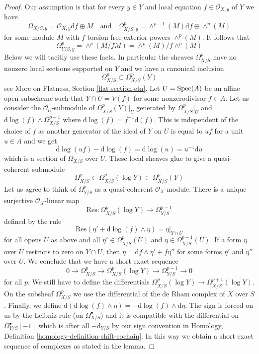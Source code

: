 \begin{proof}
Our assumption is that for every $y \in Y$ and local equation
$f \in \mathcal{O}_{X, y}$ of $Y$ we have
$$
\Omega_{X/S, y} = \mathcal{O}_{X, y}\text{d}f \oplus M
\quad\text{and}\quad
\Omega^p_{X/S, y} = \wedge^{p - 1}(M)\text{d}f \oplus \wedge^p(M)
$$
for some module $M$ with $f$-torsion free exterior powers $\wedge^p(M)$.
It follows that
$$
\Omega^p_{Y/S, y} = \wedge^p(M/fM) = \wedge^p(M)/f\wedge^p(M)
$$
Below we will tacitly use these facts.
In particular the sheaves $\Omega^p_{X/S}$ have no nonzero local
sections supported on $Y$ and we have a canonical inclusion
$$
\Omega^p_{X/S} \subset \Omega^p_{X/S}(Y)
$$
see More on Flatness, Section \ref{flat-section-eta}. Let $U = \mathop{\mathrm{Spec}}(A)$
be an affine open subscheme such that $Y \cap U = V(f)$ for some
nonzerodivisor $f \in A$. Let us consider the $\mathcal{O}_U$-submodule
of $\Omega^p_{X/S}(Y)|_U$ generated by
$\Omega^p_{X/S}|_U$ and $\text{d}\log(f) \wedge \Omega^{p - 1}_{X/S}$
where $\text{d}\log(f) = f^{-1}\text{d}(f)$.
This is independent of the choice of $f$ as another generator of the
ideal of $Y$ on $U$ is equal to $uf$ for a unit $u \in A$ and we get
$$
\text{d}\log(uf) - \text{d}\log(f) = \text{d}\log(u) = u^{-1}\text{d}u
$$
which is a section of $\Omega_{X/S}$ over $U$. These local
sheaves glue to give a quasi-coherent submodule
$$
\Omega^p_{X/S} \subset \Omega^p_{X/S}(\log Y) \subset \Omega^p_{X/S}(Y)
$$
Let us agree to think of $\Omega^p_{Y/S}$ as a quasi-coherent
$\mathcal{O}_X$-module. There is a unique surjective
$\mathcal{O}_X$-linear map
$$
\text{Res} : \Omega^p_{X/S}(\log Y) \to \Omega^{p - 1}_{Y/S}
$$
defined by the rule
$$
\text{Res}(\eta' + \text{d}\log(f) \wedge \eta) = \eta|_{Y \cap U}
$$
for all opens $U$ as above and all
$\eta' \in \Omega^p_{X/S}(U)$ and $\eta \in \Omega^{p - 1}_{X/S}(U)$.
If a form $\eta$ over $U$ restricts to zero on $Y \cap U$, then
$\eta = \text{d}f \wedge \eta' + f\eta''$ for some forms $\eta'$ and $\eta''$
over $U$. We conclude that
we have a short exact sequence
$$
0 \to \Omega^p_{X/S} \to \Omega^p_{X/S}(\log Y) \to \Omega^{p - 1}_{Y/S} \to 0
$$
for all $p$. We still have to define the differentials
$\Omega^p_{X/S}(\log Y) \to \Omega^{p + 1}_{X/S}(\log Y)$.
On the subsheaf $\Omega^p_{X/S}$ we use the differential of
the de Rham complex of $X$ over $S$. Finally, we define
$\text{d}(\text{d}\log(f) \wedge \eta) = -\text{d}\log(f) \wedge \text{d}\eta$.
The sign is forced on us by the Leibniz rule (on $\Omega^\bullet_{X/S}$)
and it is compatible with the differential on $\Omega^\bullet_{Y/S}[-1]$
which is after all $-\text{d}_{Y/S}$ by our sign convention in
Homology, Definition \ref{homology-definition-shift-cochain}.
In this way we obtain a short exact
sequence of complexes as stated in the lemma.
\end{proof}

